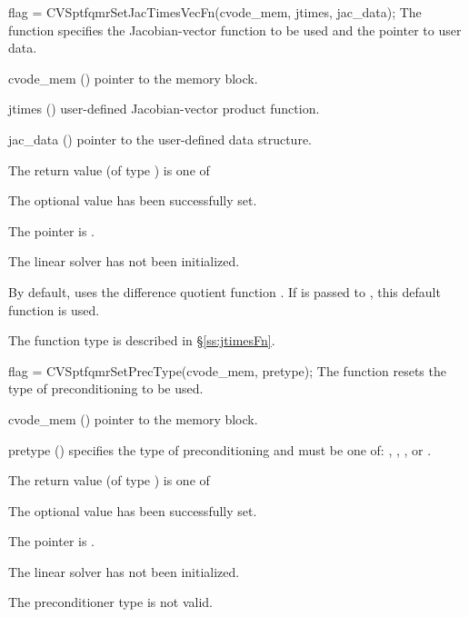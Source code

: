 {
  flag = CVSptfqmrSetJacTimesVecFn(cvode\_mem, jtimes, jac\_data);
}
{
  The function  specifies the Jacobian-vector 
  function to be used and the pointer to user data.
}
{
  \begin{args}
  \item[cvode\_mem] ()
    pointer to the {\cvode} memory block.
  \item[jtimes] ()
    user-defined Jacobian-vector product function.
  \item[jac\_data] ()
     pointer to the user-defined data structure.
  \end{args}
}
{
  The return value  (of type ) is one of
  \begin{args}
  \item[\Id{CVSPTFQMR\_SUCCESS}] 
    The optional value has been successfully set.
  \item[\Id{CVSPTFQMR\_MEM\_NULL}]
    The  pointer is .
  \item[\Id{CVSPTFQMR\_LMEM\_NULL}]
    The {\cvsptfqmr} linear solver has not been initialized.
  \end{args}
}
{
  By default, {\cvsptfqmr} uses the difference quotient function .
  If  is passed to , this default function is used.

  The function type  is described in \S\ref{ss:jtimesFn}.
}
{
  flag = CVSptfqmrSetPrecType(cvode\_mem, pretype);
}
{
  The function  resets the type
  of preconditioning to be used.
}
{
  \begin{args}
  \item[cvode\_mem] ()
    pointer to the {\cvode} memory block.
  \item[pretype] ()
    specifies the type of preconditioning and must be one of:
    , , , or .
  \end{args}
}
{
  The return value  (of type ) is one of
  \begin{args}
  \item[\Id{CVSPTFQMR\_SUCCESS}] 
    The optional value has been successfully set.
  \item[\Id{CVSPTFQMR\_MEM\_NULL}]
    The  pointer is .
  \item[\Id{CVSPTFQMR\_LMEM\_NULL}]
    The {\cvsptfqmr} linear solver has not been initialized.
  \item[\Id{CVSPTFQMR\_ILL\_INPUT}]
    The preconditioner type  is not valid.
  \end{args}
}
